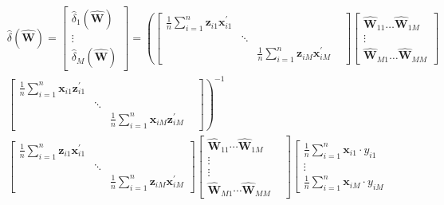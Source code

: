 \documentclass[10pt]{article}
\begin{document}
\begin{align*}
& \hat{\delta}(\widehat{\mathbf{W}})=\left[\begin{array}{c}
\hat{\delta}_{1}(\widehat{\mathbf{W}}) \\
\vdots \\
\hat{\delta}_{M}(\widehat{\mathbf{W}})
\end{array}\right]=\left(\left[\begin{array}{llll}
\frac{1}{n} \sum_{i=1}^{n} \mathbf{z}_{i 1} \mathbf{x}_{i 1}^{\prime} & & & \\
& \ddots & & \\
& & \frac{1}{n} \sum_{i=1}^{n} \mathbf{z}_{i M} \mathbf{x}_{i M}^{\prime}
\end{array}\right]\left[\begin{array}{c}
\widehat{\mathbf{W}}_{11} \ldots \widehat{\mathbf{W}}_{1 M} \\
\vdots \\
\widehat{\mathbf{W}}_{M 1} \ldots \widehat{\mathbf{W}}_{M M}
\end{array}\right]\right. \\
& \left.\left[\begin{array}{llll}
\frac{1}{n} \sum_{i=1}^{n} \mathbf{x}_{i 1} \mathbf{z}_{i 1}^{\prime} & & & \\
& \ddots & & \\
& & \frac{1}{n} \sum_{i=1}^{n} \mathbf{x}_{i M} \mathbf{z}_{i M}^{\prime}
\end{array}\right]\right)^{-1} \\
& {\left[\begin{array}{ccc}
\frac{1}{n} \sum_{i=1}^{n} \mathbf{z}_{i 1} \mathbf{x}_{i 1}^{\prime} & & \\
& \ddots & \\
& & \frac{1}{n} \sum_{i=1}^{n} \mathbf{z}_{i M} \mathbf{x}_{i M}^{\prime}
\end{array}\right]\left[\begin{array}{cc}
\widehat{\mathbf{W}}_{11} \cdots \widehat{\mathbf{W}}_{1 M} \\
\vdots & \\
\vdots \\
\widehat{\mathbf{W}}_{M 1} \cdots \widehat{\mathbf{W}}_{M M}
\end{array}\right]\left[\begin{array}{c}
\frac{1}{n} \sum_{i=1}^{n} \mathbf{x}_{i 1} \cdot y_{i 1} \\
\vdots \\
\frac{1}{n} \sum_{i=1}^{n} \mathbf{x}_{i M} \cdot y_{i M}

\end{array}}
\end{align*}
\end{document}

